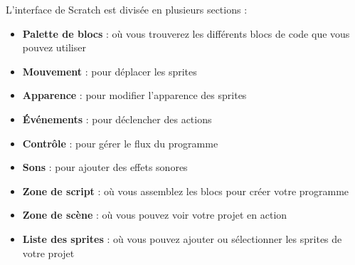 L'interface de Scratch est divisée en plusieurs sections :
\begin{itemize}
\item \textbf{Palette de blocs} : où vous trouverez les différents blocs de code que vous pouvez utiliser
\item \textbf{Mouvement} : pour déplacer les sprites
\item \textbf{Apparence} : pour modifier l'apparence des sprites
\item \textbf{Événements} : pour déclencher des actions
\item \textbf{Contrôle} : pour gérer le flux du programme
\item \textbf{Sons} : pour ajouter des effets sonores
\item \textbf{Zone de script} : où vous assemblez les blocs pour créer votre programme
\item \textbf{Zone de scène} : où vous pouvez voir votre projet en action
\item \textbf{Liste des sprites} : où vous pouvez ajouter ou sélectionner les sprites de votre projet
\end{itemize}
